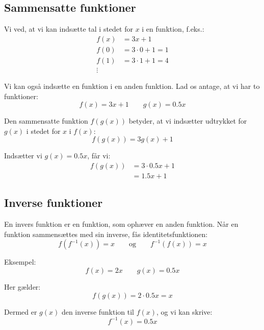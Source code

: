 \subsection{Sammensatte funktioner}
Vi ved, at vi kan indsætte tal i stedet for $x$ i en funktion, f.eks.:
\begin{align*}
    f(x) &= 3x + 1 \\
    f(0) &= 3 \cdot 0 + 1 = 1 \\
    f(1) &= 3 \cdot 1 + 1 = 4 \\
    \vdots
\end{align*}

Vi kan også indsætte en funktion i en anden funktion. Lad os antage, at vi har to funktioner:
\begin{equation*}
    f(x) = 3x + 1 \qquad g(x) = 0.5x
\end{equation*}

Den sammensatte funktion $f(g(x))$ betyder, at vi indsætter udtrykket for $g(x)$ i stedet for $x$ i $f(x)$:
\begin{equation*}
    f(g(x)) = 3g(x) + 1
\end{equation*}

Indsætter vi $g(x) = 0.5x$, får vi:
\begin{align*}
    f(g(x)) &= 3 \cdot 0.5x + 1 \\
            &= 1.5x + 1
\end{align*}

\subsection{Inverse funktioner}
En invers funktion er en funktion, som ophæver en anden funktion. Når en funktion sammensættes med sin inverse, fås identitetsfunktionen:
\begin{equation*}
    f(f^{-1}(x)) = x \qquad \text{og} \qquad f^{-1}(f(x)) = x
\end{equation*}

Eksempel:
\begin{equation*}
    f(x) = 2x \qquad g(x) = 0.5x
\end{equation*}

Her gælder:
\begin{equation*}
    f(g(x)) = 2 \cdot 0.5x = x
\end{equation*}

Dermed er $g(x)$ den inverse funktion til $f(x)$, og vi kan skrive:
\begin{equation*}
    f^{-1}(x) = 0.5x
\end{equation*}

